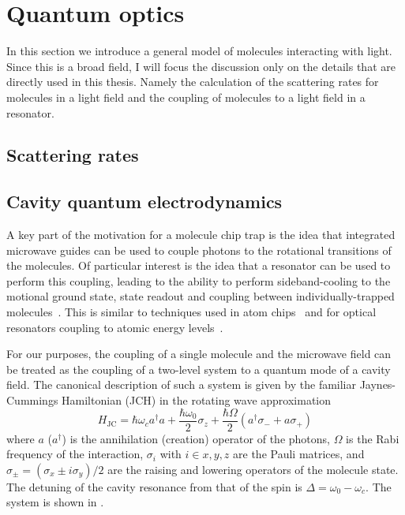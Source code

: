 


\section{Quantum optics}
\label{theory:QO}

In this section we introduce a general model of molecules interacting with
light.  Since this is a broad field, I will focus the discussion only on the
details that are directly used in this thesis.  Namely the calculation of the
scattering rates for molecules in a light field and the coupling of molecules
to a light field in a resonator.


\subsection{Scattering rates}


\subsection{Cavity quantum electrodynamics}

A key part of the motivation for a molecule chip trap is the idea that
integrated microwave guides can be used to couple photons to the rotational
transitions of the molecules. Of particular interest is the idea
that a resonator can be used to perform this coupling, leading to the
ability to perform sideband-cooling to the motional ground state, state readout
and coupling between individually-trapped molecules~\cite{Andre2006}. This is
similar to techniques used in atom chips~\cite{Treutlein2008} and for optical
resonators coupling to atomic energy levels~\cite{SchleierSmith2011}.

For our purposes, the coupling of a single molecule and the microwave field can
be treated as the coupling of a two-level system to a quantum mode of a cavity
field. The canonical description of such a system is given by the familiar
Jaynes-Cummings Hamiltonian (JCH) in the rotating wave
approximation~\cite{gerry_knight_2004}
%
\begin{equation}
  H_\text{JC} = \hbar\omega_c a^\dagger a + \frac{\hbar \omega_0}{2} \sigma_z +
  \frac{\hbar\Omega}{2}(a^\dagger \sigma_- + a\sigma_+)
  \label{theory:eqn:JCH}
\end{equation}
%
where $a$ ($a^\dagger$) is the annihilation (creation) operator of the photons,
$\Omega$ is the Rabi frequency of the interaction, $\sigma_i$ with $i\in{x, y,
z}$ are the Pauli matrices, and $\sigma_\pm =
(\sigma_x \pm i\sigma_y)/2$ are the raising and lowering operators of the
molecule state. The
detuning of the cavity resonance from that of the spin is $\Delta = \omega_0 -
\omega_c$. The system is shown in .

